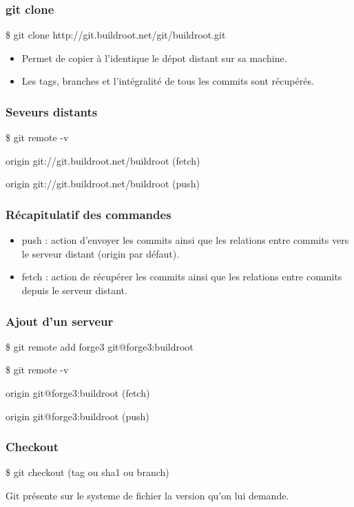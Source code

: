 \documentclass{beamer}
\begin{document}
\begin{frame}
  \frametitle{git clone}
  \begin{semiverbatim}
    \$ git clone http://git.buildroot.net/git/buildroot.git
  \end{semiverbatim}
  \begin{itemize}
    \item Permet de copier à l'identique le dépot distant sur sa machine.
    \item Les tags, branches et l'intégralité de tous les commits sont récupérés.
  \end{itemize}
\end {frame}

\begin{frame}
  \frametitle{Seveurs distants}
  \begin{semiverbatim}
    \$ git remote -v

    origin git://git.buildroot.net/buildroot (fetch)

    origin git://git.buildroot.net/buildroot (push)
  \end{semiverbatim}
\end{frame}

\begin{frame}
  \frametitle{Récapitulatif des commandes}
  \begin{itemize}
  \item push : action d'envoyer les commits ainsi que les relations entre commits vers le serveur distant (origin par défaut).
  \item fetch : action de récupérer les commits ainsi que les relations entre commits depuis le serveur distant.
  \end{itemize}
\end{frame}

\begin{frame}
  \frametitle{Ajout d'un serveur}
  \begin{semiverbatim}
    \$ git remote add forge3 git@forge3:buildroot

    \$ git remote -v

    origin git@forge3:buildroot (fetch)

    origin git@forge3:buildroot (push)

  \end{semiverbatim}
\end{frame}

\begin{frame}
  \frametitle{Checkout}
  \begin{semiverbatim}
    \$ git checkout (tag ou sha1 ou branch)
    
    Git présente sur le systeme de fichier la version qu'on lui demande.
  \end{semiverbatim}
\end{frame}
\end{document}
